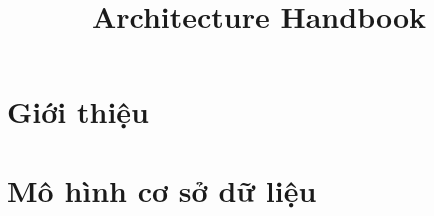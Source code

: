 \documentclass[12pt, a4paper]{article}
\title{Architecture Handbook}
\begin{document}

\clearpage


\clearpage

\tableofcontents
\clearpage

\listoffigures
\clearpage

%	




% 
\section{Giới thiệu}


\section{Mô hình cơ sở dữ liệu}



\end{document}
